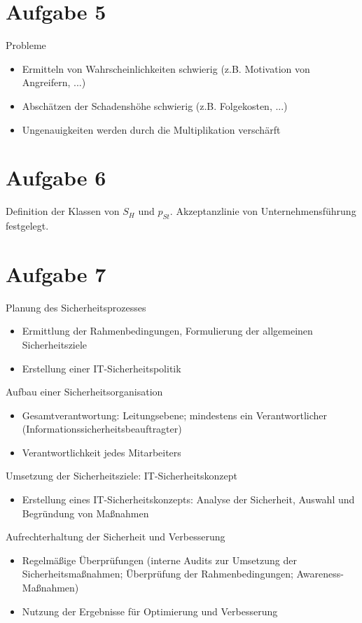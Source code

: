 \documentclass{article}
\begin{document}
	\section*{Aufgabe 5}
	Probleme
	\begin{itemize}
		\item Ermitteln von Wahrscheinlichkeiten schwierig (z.B. Motivation von Angreifern, ...)
		\item Abschätzen der Schadenshöhe schwierig (z.B. Folgekosten, ...)
		\item Ungenauigkeiten werden durch die Multiplikation verschärft
	\end{itemize}
	
	\section*{Aufgabe 6}
	Definition der Klassen von $S_H$ und $p_{St}$. Akzeptanzlinie von Unternehmensführung festgelegt.
	
	\section*{Aufgabe 7}
	Planung des Sicherheitsprozesses
	\begin{itemize}
		\item Ermittlung der Rahmenbedingungen, Formulierung der allgemeinen Sicherheitsziele
		\item Erstellung einer IT-Sicherheitspolitik
	\end{itemize}
	Aufbau einer Sicherheitsorganisation
	\begin{itemize}
		\item Gesamtverantwortung: Leitungsebene; mindestens ein Verantwortlicher (Informationssicherheitsbeauftragter)
		\item Verantwortlichkeit jedes Mitarbeiters
	\end{itemize}
	Umsetzung der Sicherheitsziele: IT-Sicherheitskonzept
	\begin{itemize}
		\item Erstellung eines IT-Sicherheitskonzepts: Analyse der Sicherheit, Auswahl und Begründung von Maßnahmen
	\end{itemize}
	Aufrechterhaltung der Sicherheit und Verbesserung
	\begin{itemize}
		\item Regelmäßige Überprüfungen (interne Audits zur Umsetzung der Sicherheitsmaßnahmen; Überprüfung der Rahmenbedingungen; Awareness-Maßnahmen)
		\item Nutzung der Ergebnisse für Optimierung und Verbesserung
	\end{itemize}
	
\end{document}
